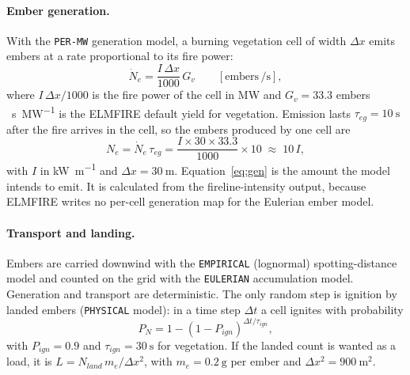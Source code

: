 \paragraph{Ember generation.} With the \texttt{PER-MW} generation model, a burning vegetation cell
of width $\Delta x$ emits embers at a rate proportional to its fire power:
\begin{equation}
  \dot N_e = \frac{I\,\Delta x}{1000}\,G_v \qquad [\text{embers}\,\si{\per\second}],
  \label{eq:genrate}
\end{equation}
where $I\,\Delta x/1000$ is the fire power of the cell in MW and $G_v = 33.3$ embers
\si{\per\second\per\mega\watt} is the ELMFIRE default yield for vegetation. Emission lasts
$\tau_{eg} = \SI{10}{\second}$ after the fire arrives in the cell, so the embers produced by one cell are
\begin{equation}
  N_e = \dot N_e\,\tau_{eg} = \frac{I \times 30 \times 33.3}{1000}\times 10 \;\approx\; 10\,I ,
  \label{eq:gen}
\end{equation}
with $I$ in \si{\kilo\watt\per\metre} and $\Delta x = \SI{30}{\metre}$. Equation~\eqref{eq:gen} is the
amount the model intends to emit. It is calculated from the fireline-intensity output, because ELMFIRE
writes no per-cell generation map for the Eulerian ember model.

\paragraph{Transport and landing.} Embers are carried downwind with the \texttt{EMPIRICAL}
(lognormal) spotting-distance model and counted on the grid with the \texttt{EULERIAN} accumulation
model. Generation and transport are deterministic. The only random step is ignition by landed embers
(\texttt{PHYSICAL} model): in a time step $\Delta t$ a cell ignites with probability
\begin{equation}
  P_N = 1-(1-P_{ign})^{\Delta t/\tau_{ign}} ,
  \label{eq:pign}
\end{equation}
with $P_{ign}=0.9$ and $\tau_{ign} = \SI{30}{\second}$ for vegetation. If the landed count is wanted as a
load, it is $L = N_{land}\,m_e/\Delta x^2$, with $m_e = \SI{0.2}{\gram}$ per ember and
$\Delta x^2 = \SI{900}{\metre\squared}$.

